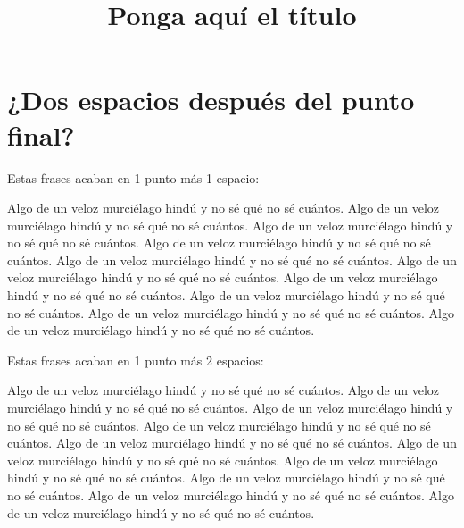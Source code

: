\documentclass[a4paper, 11pt]{article}
\title{Ponga aquí el título}
\begin{document}



\newpage
\section{¿Dos espacios después del punto final?}

\noindent
Estas frases acaban en 1 punto más 1 espacio:

Algo de un veloz murciélago hindú y no sé qué no sé cuántos. Algo de un veloz murciélago hindú y no sé qué no sé cuántos. Algo de un veloz murciélago hindú y no sé qué no sé cuántos. Algo de un veloz murciélago hindú y no sé qué no sé cuántos. Algo de un veloz murciélago hindú y no sé qué no sé cuántos. Algo de un veloz murciélago hindú y no sé qué no sé cuántos. Algo de un veloz murciélago hindú y no sé qué no sé cuántos. Algo de un veloz murciélago hindú y no sé qué no sé cuántos. Algo de un veloz murciélago hindú y no sé qué no sé cuántos. Algo de un veloz murciélago hindú y no sé qué no sé cuántos.

\smallskip
\noindent
Estas frases acaban en 1 punto más 2 espacios:

Algo de un veloz murciélago hindú y no sé qué no sé cuántos.  Algo de un veloz murciélago hindú y no sé qué no sé cuántos.  Algo de un veloz murciélago hindú y no sé qué no sé cuántos.  Algo de un veloz murciélago hindú y no sé qué no sé cuántos.  Algo de un veloz murciélago hindú y no sé qué no sé cuántos.  Algo de un veloz murciélago hindú y no sé qué no sé cuántos.  Algo de un veloz murciélago hindú y no sé qué no sé cuántos.  Algo de un veloz murciélago hindú y no sé qué no sé cuántos.  Algo de un veloz murciélago hindú y no sé qué no sé cuántos.  Algo de un veloz murciélago hindú y no sé qué no sé cuántos.
\end{document}
